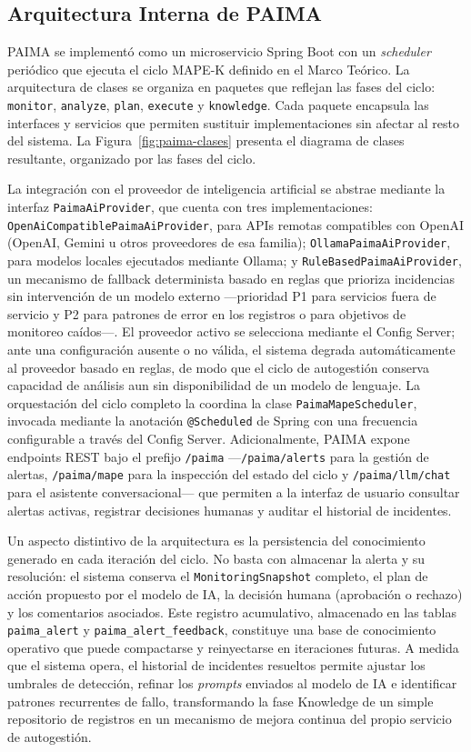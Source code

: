 \subsection{Arquitectura Interna de PAIMA}

PAIMA se implementó como un microservicio Spring Boot con un \textit{scheduler}
periódico que ejecuta el ciclo MAPE-K definido en el Marco Teórico. La
arquitectura de clases se organiza en paquetes que reflejan las fases del
ciclo: \texttt{monitor}, \texttt{analyze}, \texttt{plan}, \texttt{execute} y
\texttt{knowledge}. Cada paquete encapsula las interfaces y servicios que
permiten sustituir implementaciones sin afectar al resto del sistema. La
Figura~\ref{fig:paima-clases} presenta el diagrama de clases resultante,
organizado por las fases del ciclo.

La integración con el proveedor de inteligencia artificial se abstrae mediante la
interfaz \texttt{PaimaAiProvider}, que cuenta con tres implementaciones:
\texttt{OpenAiCompatiblePaimaAiProvider}, para APIs remotas compatibles con
OpenAI (OpenAI, Gemini u otros proveedores de esa familia);
\texttt{OllamaPaimaAiProvider}, para modelos locales ejecutados mediante Ollama;
y \texttt{RuleBasedPaimaAiProvider}, un mecanismo de fallback determinista basado
en reglas que prioriza incidencias sin intervención de un modelo externo
---prioridad P1 para servicios fuera de servicio y P2 para patrones de error en
los registros o para objetivos de monitoreo caídos---. El proveedor activo se
selecciona mediante el Config Server; ante una configuración ausente o no válida,
el sistema degrada automáticamente al proveedor basado en reglas, de modo que el
ciclo de autogestión conserva capacidad de análisis aun sin disponibilidad de un
modelo de lenguaje. La orquestación del ciclo completo la coordina la clase
\texttt{PaimaMapeScheduler}, invocada mediante la
anotación \texttt{@Scheduled} de Spring con una frecuencia configurable a través
del Config Server. Adicionalmente, PAIMA expone endpoints REST bajo el prefijo
\texttt{/paima} ---\texttt{/paima/alerts} para la gestión de alertas,
\texttt{/paima/mape} para la inspección del estado del ciclo y
\texttt{/paima/llm/chat} para el asistente conversacional--- que permiten a la
interfaz de usuario consultar alertas
activas, registrar decisiones humanas y auditar el historial de incidentes.

Un aspecto distintivo de la arquitectura es la persistencia del conocimiento
generado en cada iteración del ciclo. No basta con almacenar la alerta y su
resolución: el sistema conserva el \texttt{MonitoringSnapshot} completo, el plan de
acción propuesto por el modelo de IA, la decisión humana (aprobación o rechazo) y
los comentarios asociados. Este registro acumulativo, almacenado en las tablas
\texttt{paima\_alert} y \texttt{paima\_alert\_feedback}, constituye una base de
conocimiento operativo que puede compactarse y reinyectarse en iteraciones futuras.
A medida que el sistema opera, el historial de incidentes resueltos permite ajustar
los umbrales de detección, refinar los \textit{prompts} enviados al modelo de IA e
identificar patrones recurrentes de fallo, transformando la fase Knowledge de un
simple repositorio de registros en un mecanismo de mejora continua del propio
servicio de autogestión.

